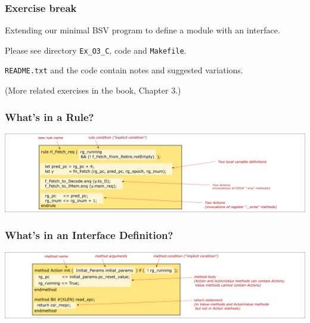 
\begin{frame}
\frametitle{\EmojiExercise \hmm Exercise break}

Extending our minimal BSV program to define a module with an interface.

\vspace{2ex}

Please see directory {\tt Ex\_O3\_C}, code and {\tt Makefile}.

\vspace*{5ex}

{\tt README.txt} and the code contain notes and suggested variations.

\vspace{1ex}

(More related exercises in the book, Chapter 3.)

\end{frame}


\begin{frame}
\frametitle{What's in a Rule?}

\begin{center}
\includegraphics[width=\textwidth]{../Figures/Fig_BSV_whats_in_a_rule}
\end{center}

\end{frame}


\begin{frame}
\frametitle{What's in an Interface Definition?}

\begin{center}
\includegraphics[width=\textwidth]{../Figures/Fig_BSV_whats_in_an_interface_def}
\end{center}

\end{frame}

